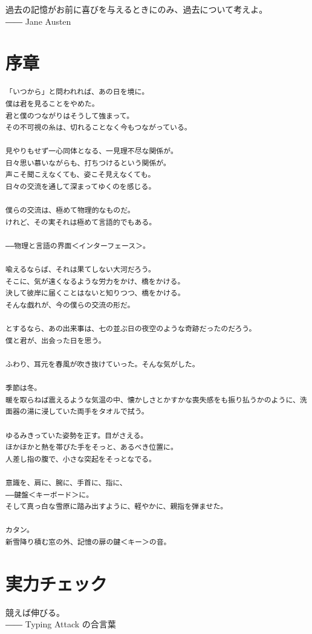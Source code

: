 
\begin{screen}
過去の記憶がお前に喜びを与えるときにのみ、過去について考えよ。\\
―― Jane Austen
\end{screen}

\section*{序章}

\begin{verbatim}
「いつから」と問われれば、あの日を境に。
僕は君を見ることをやめた。
君と僕のつながりはそうして強まって。
その不可視の糸は、切れることなく今もつながっている。

見やりもせず一心同体となる、一見理不尽な関係が。
日々思い慕いながらも、打ちつけるという関係が。
声こそ聞こえなくても、姿こそ見えなくても。
日々の交流を通して深まってゆくのを感じる。

僕らの交流は、極めて物理的なものだ。
けれど、その実それは極めて言語的でもある。

――物理と言語の界面＜インターフェース＞。

喩えるならば、それは果てしない大河だろう。
そこに、気が遠くなるような労力をかけ、橋をかける。
決して彼岸に届くことはないと知りつつ、橋をかける。
そんな戯れが、今の僕らの交流の形だ。

とするなら、あの出来事は、七の並ぶ日の夜空のような奇跡だったのだろう。
僕と君が、出会った日を思う。

ふわり、耳元を春風が吹き抜けていった。そんな気がした。

季節は冬。
暖を取らねば震えるような気温の中、懐かしさとかすかな喪失感をも振り払うかのように、洗面器の湯に浸していた両手をタオルで拭う。

ゆるみきっていた姿勢を正す。目がさえる。
ほかほかと熱を帯びた手をそっと、あるべき位置に。
人差し指の腹で、小さな突起をそっとなでる。

意識を、肩に、腕に、手首に、指に、
――鍵盤＜キーボード＞に。
そして真っ白な雪原に踏み出すように、軽やかに、親指を弾ませた。

カタン。
新雪降り積む窓の外、記憶の扉の鍵＜キー＞の音。
\end{verbatim}

\section{実力チェック}
\begin{screen}
競えば伸びる。\\
―― Typing Attack の合言葉
\end{screen}

